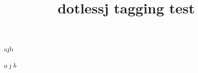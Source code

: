 \documentclass{article}
\title{dotlessj tagging test}
\begin{document}
a\j b

$a\jmath b$
\end{document}

